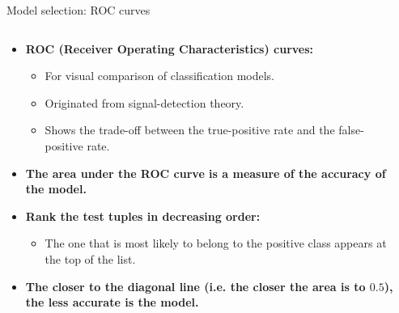 \documentclass[aspectratio=169,t,table]{beamer}
\begin{document}
  {
    \begin{frame}{Model selection: ROC curves}
      \begin{columns}
        \begin{column}{0.6\textwidth}
          \begin{itemize}
            \item \textbf{ROC (Receiver Operating Characteristics) curves:}
            \begin{itemize}
              \item For visual comparison of classification models.
              \item Originated from signal-detection theory.
              \item Shows the trade-off between the true-positive rate and the false-positive rate.
            \end{itemize}
            \item \textbf{The area under the ROC curve is a {\color{airforceblue}measure of the accuracy} of the model.}
            \item \textbf{{\color{airforceblue}Rank the test tuples} in decreasing order:}
            \begin{itemize}
              \item The one that is most likely to belong to the positive class appears at the top of the list.
            \end{itemize}
            \item \textbf{The closer to the diagonal line (i.e. the closer the area is to $0.5$), the less accurate is the model.}
          \end{itemize}
        \end{column}
        \begin{column}{0.5\textwidth}

        \end{column}
      \end{columns}
    \end{frame}
  }
\end{document}
